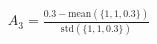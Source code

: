 \documentclass[preview]{standalone}
\begin{document}
\begin{align*}
A_3 = \frac{0.3 - \text{mean}\left(\{1, 1, 0.3\}\right)}{\text{std}\left(\{1, 1, 0.3\}\right)}
\end{align*}
\end{document}
